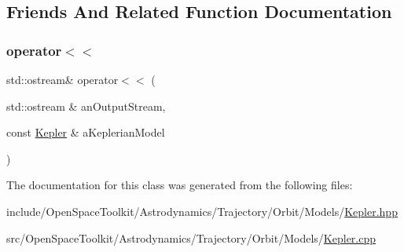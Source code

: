 \subsection{Friends And Related Function Documentation}
\mbox{\label{classostk_1_1astro_1_1trajectory_1_1orbit_1_1models_1_1_kepler_aedb386ce32716dfb187f89b52b023f2b}} 
\subsubsection{\texorpdfstring{operator$<$$<$}{operator<<}}
{\footnotesize\ttfamily std\+::ostream\& operator$<$$<$ (\begin{DoxyParamCaption}\item[{std\+::ostream \&}]{an\+Output\+Stream,  }\item[{const \hyperlink{classostk_1_1astro_1_1trajectory_1_1orbit_1_1models_1_1_kepler}{Kepler} \&}]{a\+Keplerian\+Model }\end{DoxyParamCaption})\hspace{0.3cm}{\ttfamily [friend]}}



The documentation for this class was generated from the following files\+:\begin{DoxyCompactItemize}
\item 
include/\+Open\+Space\+Toolkit/\+Astrodynamics/\+Trajectory/\+Orbit/\+Models/\hyperlink{_kepler_8hpp}{Kepler.\+hpp}\item 
src/\+Open\+Space\+Toolkit/\+Astrodynamics/\+Trajectory/\+Orbit/\+Models/\hyperlink{_kepler_8cpp}{Kepler.\+cpp}\end{DoxyCompactItemize}
